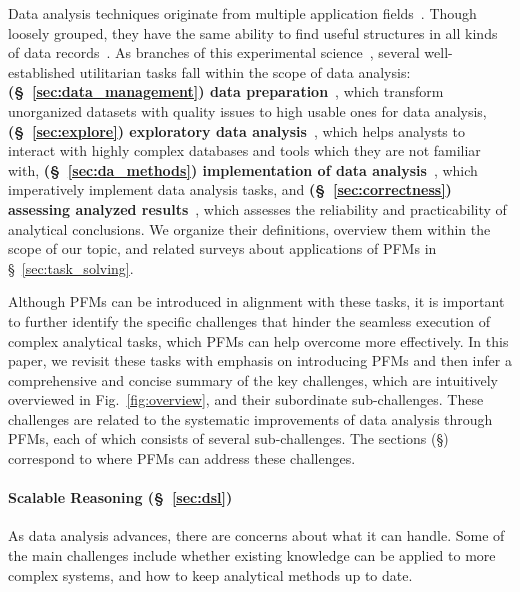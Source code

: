   
  Data analysis techniques originate from multiple application fields~\cite{SPIREX, vertsel2024hybrid,gerussi2022llm,Zhang2024LargeLM,truhn2023large}. Though loosely grouped, they have the same ability to find useful structures in all kinds of data records~\cite{launer2014modern}. As branches of this experimental science~\cite{brandt1976statistical}, several well-established utilitarian tasks fall within the scope of data analysis: \textbf{(\S~\ref{sec:data_management}) data preparation}~\cite{van2020data,olson2003data}, which transform unorganized datasets with quality issues to high usable ones for data analysis, \textbf{(\S~\ref{sec:explore}) exploratory data analysis}~\cite{myatt2007making}, which helps analysts to interact with highly complex databases and tools which they are not familiar with, \textbf{(\S~\ref{sec:da_methods}) implementation of data analysis}~\cite{brandt1976statistical,nisbet2009handbook}, which imperatively implement data analysis tasks, and \textbf{(\S~\ref{sec:correctness}) assessing analyzed results}~\cite{brooker2020practical,bruce2020practical,kenett2016information}, which assesses the reliability and practicability of analytical conclusions. We organize their definitions, overview them within the scope of our topic, and related surveys about applications of PFMs in \S~\ref{sec:task_solving}.
  
  Although PFMs can be introduced in alignment with these tasks, it is important to further identify the specific challenges that hinder the seamless execution of complex analytical tasks, which PFMs can help overcome more effectively. In this paper, we revisit these tasks with emphasis on introducing PFMs and then infer a comprehensive and concise summary of the key challenges, which are intuitively overviewed in Fig.~\ref{fig:overview}, and their subordinate sub-challenges. These challenges are related to the systematic improvements of data analysis through PFMs, each of which consists of several sub-challenges. The sections (\S) correspond to where PFMs can address these challenges.
  
  \paragraph{\textbf{Scalable Reasoning (\S~\ref{sec:dsl})}}  
  As data analysis advances, there are concerns about what it can handle. Some of the main challenges include whether existing knowledge can be applied to more complex systems, and how to keep analytical methods up to date.
  
